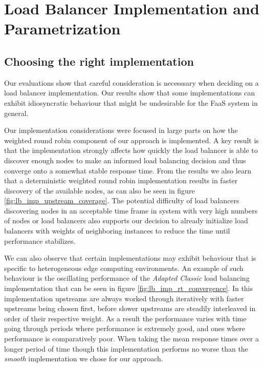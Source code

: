 \section{Load Balancer Implementation and Parametrization}
\subsection{Choosing the right implementation}
Our evaluations show that careful consideration is necesssary when deciding on a load balancer implementation.
Our results show that some implementations can exhibit idiosyncratic behaviour that might be undesirable for the FaaS system in general.

Our implementation considerations were focused in large parts on how the weighted round robin component of our approach is implemented.
A key result is that the implementation strongly affects how quickly the load balancer is able to discover enough nodes to make an informed load balancing decision and thus converge onto a somewhat stable response time.
From the results we also learn that a deterministic weighted round robin implementation results in faster discovery of the available nodes, as can also be seen in figure \ref{fig:lb_imp_upstream_coverage}.
The potential difficulty of load balancers discovering nodes in an acceptable time frame in system with very high numbers of nodes or load balancers also supports our decision to already initialize load balancers with weights of neighboring instances to reduce the time until performance stabilizes.

We can also observe that certain implementations may exhibit behaviour that is specific to heterogeneous edge computing environments.
An example of such behaviour is the oscillating performance of the \textit{Adapted Classic} load balancing implementation that can be seen in figure \ref{fig:lb_imp_rt_convergence}.
In this implementation upstreams are always worked through iteratively with faster upstreams being chosen first, before slower upstreams are steadily interleaved in order of their respective weight.
As a result the performance varies with time going through periods where performance is extremely  good, and ones where performance is comparatively poor.
When taking the mean response times over a longer period of time though this implementation performs no worse than the \textit{smooth} implementation we chose for our approach.

